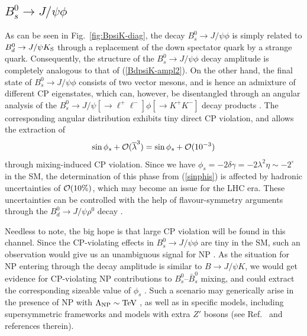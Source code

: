 \documentclass[11pt]{cernrep}
\begin{document}
%
%
%
\boldmath
\subsection{$B^0_s\to J/\psi \phi$}\label{ssec:BsPsiPhi}
\unboldmath
%
%
%
As can be seen in Fig.~\ref{fig:BpsiK-diag}, the decay $B^0_s\to J/\psi \phi$
is simply related to $B^0_d\to J/\psi K_{\rm S}$ through a
replacement of the down spectator quark by a strange quark. Consequently,
the structure of the $B^0_s\to J/\psi\phi$ decay amplitude is  
completely analogous to that of (\ref{BdpsiK-ampl2}). On the other hand, the 
final state of  $B^0_s\to J/\psi\phi$ consists of two vector mesons, and is hence
an admixture of different CP eigenstates, which can, however, be disentangled 
through an angular analysis of the $B^0_s\to J/\psi [\to\ell^+\ell^-]\phi[\to K^+K^-]$
decay products \cite{DDF,DDLR}. The corresponding angular distribution 
exhibits tiny direct CP violation, and allows the extraction of
\begin{equation}\label{sinphis}
\sin\phi_s+{\cal O}(\overline{\lambda}^3)=\sin\phi_s+{\cal O}(10^{-3})
\end{equation}
through mixing-induced CP violation.
Since we have $\phi_s=-2\delta\gamma=-2\lambda^2\eta\sim
-2^\circ$ in the SM, the 
determination of this phase from (\ref{sinphis}) is affected by
hadronic uncertainties of ${\cal O}(10\%)$, which may become an issue 
for the LHC era. These uncertainties can be controlled with
the help of flavour-symmetry arguments through the 
$B^0_d\to J/\psi \rho^0$ decay \cite{RF-ang}.

Needless to note, the big hope is that large CP violation
will be found in this channel. Since the CP-violating effects in 
$B^0_s\to J/\psi\phi$ are tiny in the SM, such an observation 
would give us an unambiguous
signal for NP \cite{DFN,NiSi,Branco}. As the situation for NP entering 
through the decay amplitude is similar to $B\to J/\psi K$, we would get 
evidence for CP-violating NP contributions to $B^0_s$--$\bar B^0_s$ mixing, 
and could extract the corresponding sizeable value of $\phi_s$ \cite{DFN}.
Such a scenario may generically arise in the presence of NP with 
$\Lambda_{\rm NP}\sim\mbox{TeV}$ \cite{RF-Phys-Rep}, as well as 
in specific models, including supersymmetric frameworks and models
with extra $Z'$ bosons (see Ref.~\cite{BF-DMs} and references therein).
\end{document}
